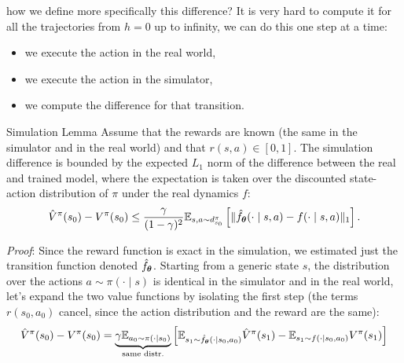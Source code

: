 \documentclass[10pt, a4paper]{report}
\begin{document}
how we define more specifically this difference? It is very hard to compute it for all the trajectories from $h=0$ up to infinity, we can do this one step at a time:\begin{itemize}
    \item we execute the action in the real world,
    \item we execute the action in the simulator,
    \item we compute the difference for that transition.
\end{itemize}
\begin{boxtheorem}{Simulation Lemma}{}
    Assume that the rewards are known (the same in the simulator and in the real world) and that $r(s,a)\in[0,1]$. The simulation difference is bounded by the expected $L_1$ norm of the difference between the real and trained model, where the expectation is taken over the discounted state-action distribution of $\pi$ under the real dynamics $f$:\begin{equation}
        \hat V^\pi(s_0)-  V^\pi(s_0)\le \frac{\gamma}{(1-\gamma)^2}{\mathbb E}_{s,a\sim d_{s_0}^\pi}\left[\|
    \hat f_{\boldsymbol{\theta}} (\cdot\mid s,a)-f (\cdot\mid s,a)
    \|_1\right].
    \end{equation}
\end{boxtheorem}
\noindent\textit{Proof}: Since the reward function is exact in the simulation, we estimated just the transition function denoted $\hat f_{\boldsymbol{\theta}}$. Starting from a generic state $s$, the distribution over the actions $a \sim \pi(\cdot \mid s)$ is identical in the simulator and in the real world, let's expand the two value functions by isolating the first step (the terms $r(s_0,a_0)$ cancel, since the action distribution and the reward are the same):\begin{equation}
     \hat V^\pi(s_0)-  V^\pi(s_0)=
     \underbrace{\gamma{\mathbb E}_{a_0\sim\pi(\cdot\mid s_0)}}_{\text{same distr.}}\left[
        {\mathbb E}_{s_1\sim\hat f_{\boldsymbol{\theta}}(\cdot\mid s_0,a_0)}\hat V^\pi(s_1)-
        {\mathbb E}_{s_1\sim f(\cdot\mid s_0,a_0)} V^\pi(s_1)
     \right]
\end{equation}
\end{document}

